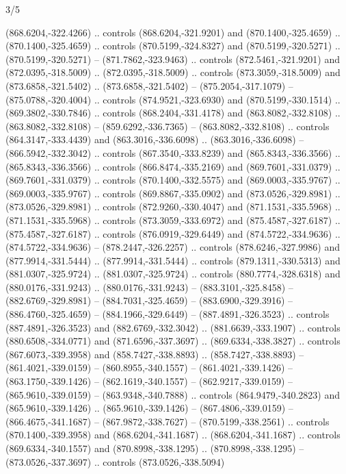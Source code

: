 \begin{flagdescription}{3/5}
\begin{scope}[xshift=0.5\flaglength,yshift=0.5\flagwidth,scale=\flagwidth/99]
\begin{scope}[y=0.8pt, x=0.8pt, yscale=-0.20628, xscale=0.20628,shift={(-500,-300)}]
\begin{scope}[cm={{0.79646,0.0,0.0,0.7753,(100.0721,273.79617)}}]
\begin{scope}[cm={{1.08438,0.0,0.0,1.08438,(-425.76596,333.57046)}}]
  (868.6204,-322.4266) .. controls (868.6204,-321.9201) and (870.1400,-325.4659)
  .. (870.1400,-325.4659) .. controls (870.5199,-324.8327) and
  (870.5199,-320.5271) .. (870.5199,-320.5271) -- (871.7862,-323.9463) ..
  controls (872.5461,-321.9201) and (872.0395,-318.5009) .. (872.0395,-318.5009)
  .. controls (873.3059,-318.5009) and (873.6858,-321.5402) ..
  (873.6858,-321.5402) -- (875.2054,-317.1079) -- (875.0788,-320.4004) ..
  controls (874.9521,-323.6930) and (870.5199,-330.1514) .. (869.3802,-330.7846)
  .. controls (868.2404,-331.4178) and (863.8082,-332.8108) ..
  (863.8082,-332.8108) -- (859.6292,-336.7365) -- (863.8082,-332.8108) ..
  controls (864.3147,-333.4439) and (863.3016,-336.6098) .. (863.3016,-336.6098)
  -- (866.5942,-332.3042) .. controls (867.3540,-333.8239) and
  (865.8343,-336.3566) .. (865.8343,-336.3566) .. controls (866.8474,-335.2169)
  and (869.7601,-331.0379) .. (869.7601,-331.0379) .. controls
  (870.1400,-332.5575) and (869.0003,-335.9767) .. (869.0003,-335.9767) ..
  controls (869.8867,-335.0902) and (873.0526,-329.8981) .. (873.0526,-329.8981)
  .. controls (872.9260,-330.4047) and (871.1531,-335.5968) ..
  (871.1531,-335.5968) .. controls (873.3059,-333.6972) and (875.4587,-327.6187)
  .. (875.4587,-327.6187) .. controls (876.0919,-329.6449) and
  (874.5722,-334.9636) .. (874.5722,-334.9636) -- (878.2447,-326.2257) ..
  controls (878.6246,-327.9986) and (877.9914,-331.5444) .. (877.9914,-331.5444)
  .. controls (879.1311,-330.5313) and (881.0307,-325.9724) ..
  (881.0307,-325.9724) .. controls (880.7774,-328.6318) and (880.0176,-331.9243)
  .. (880.0176,-331.9243) -- (883.3101,-325.8458) -- (882.6769,-329.8981) --
  (884.7031,-325.4659) -- (883.6900,-329.3916) -- (886.4760,-325.4659) --
  (884.1966,-329.6449) -- (887.4891,-326.3523) .. controls (887.4891,-326.3523)
  and (882.6769,-332.3042) .. (881.6639,-333.1907) .. controls
  (880.6508,-334.0771) and (871.6596,-337.3697) .. (869.6334,-338.3827) ..
  controls (867.6073,-339.3958) and (858.7427,-338.8893) .. (858.7427,-338.8893)
  -- (861.4021,-339.0159) -- (860.8955,-340.1557) -- (861.4021,-339.1426) --
  (863.1750,-339.1426) -- (862.1619,-340.1557) -- (862.9217,-339.0159) --
  (865.9610,-339.0159) -- (863.9348,-340.7888) .. controls (864.9479,-340.2823)
  and (865.9610,-339.1426) .. (865.9610,-339.1426) -- (867.4806,-339.0159) --
  (866.4675,-341.1687) -- (867.9872,-338.7627) -- (870.5199,-338.2561) ..
  controls (870.1400,-339.3958) and (868.6204,-341.1687) .. (868.6204,-341.1687)
  .. controls (869.6334,-340.1557) and (870.8998,-338.1295) ..
  (870.8998,-338.1295) -- (873.0526,-337.3697) .. controls (873.0526,-338.5094)

\end{scope}
\end{scope}
\end{scope}
\end{scope}
\end{flagdescription}
